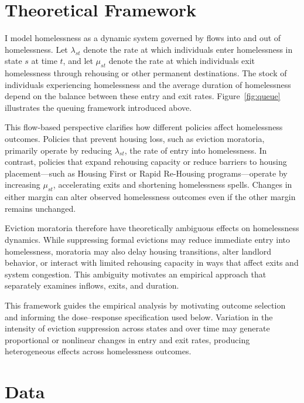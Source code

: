 \documentclass[12pt]{article}
\begin{document}
\section{Theoretical Framework}

I model homelessness as a dynamic system governed by flows into and out of homelessness. Let $\lambda_{st}$ denote the rate at which individuals enter homelessness in state $s$ at time $t$, and let $\mu_{st}$ denote the rate at which individuals exit homelessness through rehousing or other permanent destinations. The stock of individuals experiencing homelessness and the average duration of homelessness depend on the balance between these entry and exit rates. Figure~\ref{fig:queue} illustrates the queuing framework introduced above.

This flow-based perspective clarifies how different policies affect homelessness outcomes. Policies that prevent housing loss, such as eviction moratoria, primarily operate by reducing $\lambda_{st}$, the rate of entry into homelessness. In contrast, policies that expand rehousing capacity or reduce barriers to housing placement—such as Housing First or Rapid Re-Housing programs—operate by increasing $\mu_{st}$, accelerating exits and shortening homelessness spells. Changes in either margin can alter observed homelessness outcomes even if the other margin remains unchanged.

Eviction moratoria therefore have theoretically ambiguous effects on homelessness dynamics. While suppressing formal evictions may reduce immediate entry into homelessness, moratoria may also delay housing transitions, alter landlord behavior, or interact with limited rehousing capacity in ways that affect exits and system congestion. This ambiguity motivates an empirical approach that separately examines inflows, exits, and duration.

This framework guides the empirical analysis by motivating outcome selection and informing the dose–response specification used below. Variation in the intensity of eviction suppression across states and over time may generate proportional or nonlinear changes in entry and exit rates, producing heterogeneous effects across homelessness outcomes.

\section{Data}
\end{document}
